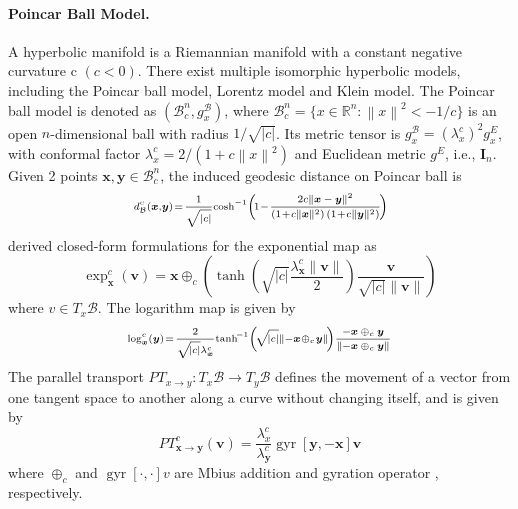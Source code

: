 \documentclass[letterpaper]{article} %
\begin{document}
\paragraph{Poincar Ball Model.}
A hyperbolic manifold is a Riemannian manifold with a constant negative curvature c $(c<0)$.
There exist multiple isomorphic hyperbolic models, including the Poincar ball model, Lorentz model and Klein model. The Poincar ball model is denoted as $(\mathcal{B}^n_c,g^\mathcal{B}_x)$, where $\mathcal{B}^n_c=\{x\in\mathbb{R}^n:\left \| x \right \|^2<-1/c\}$ is an open $n$-dimensional ball with radius $1/\sqrt{|c|}$. Its metric tensor is $g^\mathcal{B}_x=(\lambda^c_x)^2g^E_x$, with conformal factor $\lambda^c_x=2/(1+c\left \| x \right \|^2)$ and Euclidean metric $g^E$, i.e., $\mathbf{I}_n$.
Given 2 points $\boldsymbol{x}, \boldsymbol{y}\in \mathcal{B}^n_c$, the induced geodesic distance on Poincar ball is
\begin{equation}
\begin{scriptsize}
d_{\mathcal{B}}^{c}(\boldsymbol{x},\!\boldsymbol{y})\!=\!
\frac{1}{\sqrt{|c|}}\!\cosh ^{-1}\!\left(\!1\!-\!\frac{2 c\|\boldsymbol{x}-\boldsymbol{y}\|^{2}}{\left(1\!+\!c\|\boldsymbol{x}\|^{2}\right)\left(1\!+\!c\|\boldsymbol{y}\|^{2}\right)}\!\right)
\end{scriptsize}\!
\end{equation}
\citet{ganea2018hyperbolic} derived closed-form formulations for the exponential map as
\begin{equation}\label{2}
\exp _{\boldsymbol{x}}^{c}(\boldsymbol{v})=\boldsymbol{x} \oplus_{c}\left(\tanh \left(\sqrt{|c|} \frac{\lambda_{\boldsymbol{x}}^{c}\|\boldsymbol{v}\|}{2}\right) \frac{\boldsymbol{v}}{\sqrt{|c|}\|\boldsymbol{v}\|}\right)
\end{equation}
where $v\in T_x\mathcal{B}$. The logarithm map is given by
\begin{equation}\label{3}
\begin{scriptsize}
\log _{\boldsymbol{x}}^{c}(\boldsymbol{y})\!=\!\frac{2}{\sqrt{\!|c|} \lambda_{\boldsymbol{x}}^{c}}\! \tanh ^{\!-1}\!\left(\!\sqrt{\!|c|}\!\left\|-\boldsymbol{x}\! \oplus_{c}\! \boldsymbol{y}\right\|\!\right)\! \frac{-\boldsymbol{x} \oplus_{c} \boldsymbol{y}}{\left\|-\boldsymbol{x} \oplus_{c} \boldsymbol{y}\right\|}
\end{scriptsize}
\end{equation}
The parallel transport $PT_{x\rightarrow y}:T_x\mathcal{B} \rightarrow T_y\mathcal{B}$
defines the movement of a vector from one tangent space to another along a curve without changing itself, and is given by
\begin{equation}\label{4}
P T_{\mathbf{x} \rightarrow \mathbf{y}}^{c}(\mathbf{v})=\frac{\lambda_{x}^{c}}{\lambda_{\mathbf{y}}^{c}} \operatorname{gyr}[\mathbf{y},-\mathbf{x}] \mathbf{v}
\end{equation}
where $\oplus_{c}$ and $\operatorname{gyr}[\cdot,\cdot]v$ are Mbius addition \cite{ungar2007hyperbolic} and gyration operator \cite{ungar2008gyrovector}, respectively.
\end{document}

